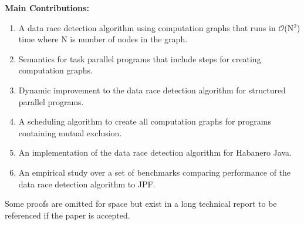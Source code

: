 \textbf{Main Contributions:}
\begin{enumerate}
\item A data race detection algorithm using computation graphs that runs in $\mathcal{O}$(N$^2$) time where N is number of nodes in the graph.
\item Semantics for task parallel programs that include steps for creating computation graphs.
\item Dynamic improvement to the data race detection algorithm for structured parallel programs.
\item A scheduling algorithm to create all computation graphs for programs containing mutual exclusion.
\item An implementation of the data race detection algorithm for Habanero Java.
\item An empirical study over a set of benchmarks comparing performance of the data race detection algorithm to JPF.
\end{enumerate}
Some proofs are omitted for space but exist in a long technical report to be referenced if the paper is accepted.

\begin{comment}
  The rest of the paper is divided as follows. Section \ref{sec:drd} introduces the concept of computation graphs for task parallel programs and discusses the data race detection algorithm based on computation graphs. Section \ref{sec:cg} presents syntax and semantics of task parallel languages and discusses the creation of computation graphs. Section \ref{sec:otf-drd} discusses dynamic improvement to the data race detection algorithm using on-the-fly analysis for structured parallel programs and a scheduler for programs with critical sections. Section \ref{sec:res} gives implementation of the algorithm for HJ and discusses the results. Section \ref{sec:rel-work} discusses related work. Section \ref{sec:conclusion} presents the conclusion.
\end{comment}
